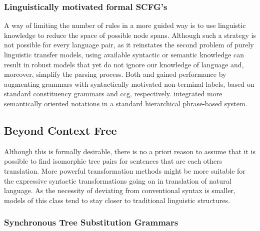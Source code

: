 \documentclass{report}
\theoremstyle{definition}
\theoremstyle{plain}
\begin{document}

\subsubsection{Linguistically motivated formal SCFG's}

A way of limiting the number of rules in a more guided way is to use linguistic knowledge to reduce the space of possible node spans. Although such a strategy is not possible for every language pair, as it reinstates the second problem of purely linguistic transfer models, using available syntactic or semantic knowledge can result in robust models that yet do not ignore our knowledge of language and, moreover, simplify the parsing process. Both \cite{zollmann2006syntax} and \cite{almaghout2010ccg} gained performance by augmenting grammars with syntactically motivated non-terminal labels, based on standard constituency grammars and ccg, respectively. \cite{li2013modeling} integrated more semantically oriented notations in a standard hierarchical phrase-based system.


\subsection{Beyond Context Free}

Although this is formally desirable, there is no a priori reason to assume that it is possible to find isomorphic tree pairs for sentences that are each others translation. More powerful transformation methods might be more suitable for the expressive syntactic transformations going on in translation of natural language. As the necessity of deviating from conventional syntax is smaller, models of this class tend to stay closer to traditional linguistic structures.

\subsubsection{Synchronous Tree Substitution Grammars}
\end{document}
